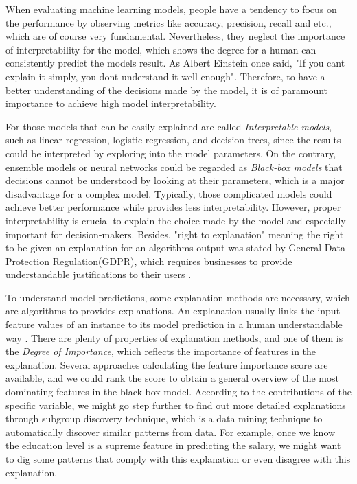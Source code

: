 \documentclass[runningheads]{llncs}
\begin{document}
	When evaluating machine learning models, people have a tendency to focus on the performance by observing metrics like accuracy, precision, recall and etc., which are of course very fundamental. Nevertheless, they neglect the importance of interpretability for the model, which shows the degree for a human can consistently predict the model\textquotesingle s result\cite{kim2016examples}. As Albert Einstein once said, "If you can\textquotesingle t explain it simply, you don\textquotesingle t understand it well enough". Therefore, to have a better understanding of the decisions made by the model, it is of paramount importance to achieve high model interpretability.
	
	For those models that can be easily explained are called \textit{Interpretable models}, such as linear regression, logistic regression, and decision trees, since the results could be interpreted by exploring into the model parameters. On the contrary, ensemble models or neural networks could be regarded as \textit{Black-box models} that decisions cannot be understood by looking at their parameters, which is a major disadvantage for a complex model. Typically, those complicated models could achieve better performance while provides less interpretability. However, proper interpretability is crucial to explain the choice made by the model and especially important for decision-makers. Besides, "right to explanation" meaning the right to be given an explanation for an algorithm\textquotesingle s output was stated by General Data Protection Regulation(GDPR), which requires businesses to provide understandable justifications to their users \cite{voigt2017eu}.
	
	To understand model predictions, some explanation methods are necessary, which are algorithms to provides explanations. An explanation usually links the input feature values of an instance to its model prediction in a human understandable way \cite{molnar2019}. There are plenty of properties of explanation methods, and one of them is the \textit{Degree of Importance}, which reflects the importance of features in the explanation\cite{robnik2018perturbation}. Several approaches calculating the feature importance score are available, and we could rank the score to obtain a general overview of the most dominating features in the black-box model. According to the contributions of the specific variable, we might go step further to find out more detailed explanations through subgroup discovery technique, which is a data mining technique to automatically discover similar patterns from data. For example, once we know the education level is a supreme feature in predicting the salary, we might want to dig some patterns that comply with this explanation or even disagree with this explanation.  
	
\end{document}
